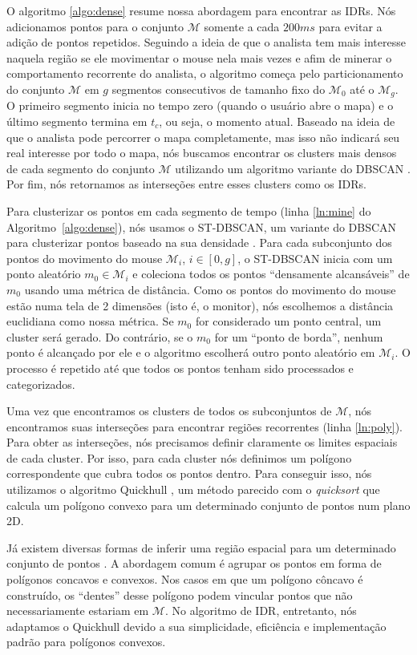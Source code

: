 O algoritmo \ref{algo:dense} resume nossa abordagem para encontrar as IDRs. Nós adicionamos pontos para o conjunto $\mathcal{M}$ somente a cada $200ms$ para evitar a adição de pontos repetidos. Seguindo a ideia de que o analista tem mais interesse naquela região se ele movimentar o mouse nela mais vezes e afim de minerar o comportamento recorrente do analista, o algoritmo começa pelo particionamento do conjunto $\mathcal{M}$ em $g$ segmentos consecutivos de tamanho fixo do $\mathcal{M}_0$ até o $\mathcal{M}_g$. O primeiro segmento inicia no tempo zero (quando o usuário abre o mapa) e o último segmento termina em $t_c$, ou seja, o momento atual. Baseado na ideia de que o analista pode percorrer o mapa completamente, mas isso não indicará seu real interesse por todo o mapa, nós buscamos encontrar os clusters mais densos de cada segmento do conjunto $\mathcal{M}$ utilizando um algoritmo variante do DBSCAN \cite{Ester:1996:DAD:3001460.3001507}. Por fim, nós retornamos as interseções entre esses clusters como os IDRs.

Para clusterizar os pontos em cada segmento de tempo (linha \ref{ln:mine} do Algoritmo~\ref{algo:dense}), nós usamos o ST-DBSCAN, um variante do DBSCAN para clusterizar pontos baseado na sua densidade \cite{Birant:2007}. Para cada subconjunto dos pontos do movimento do mouse $\mathcal{M}_i$, $i \in [0,g]$, o ST-DBSCAN inicia com um ponto aleatório $m_0 \in \mathcal{M}_i$ e coleciona todos os pontos ``densamente alcansáveis'' de $m_0$ usando uma métrica de distância. Como os pontos do movimento do mouse estão numa tela de 2 dimensões (isto é, o monitor), nós escolhemos a distância euclidiana como nossa métrica. Se $m_0$ for considerado um ponto central,  um cluster será gerado. Do contrário, se o $m_0$ for um ``ponto de borda'', nenhum ponto é alcançado por ele e o algoritmo escolherá outro ponto aleatório em $\mathcal{M}_i$. O processo é repetido até que todos os pontos tenham sido processados e categorizados.

Uma vez que encontramos os clusters de todos os subconjuntos de $\mathcal{M}$, nós encontramos suas interseções para encontrar regiões recorrentes (linha \ref{ln:poly}). Para obter as interseções, nós precisamos definir claramente os limites espaciais de cada cluster. Por isso, para cada cluster nós definimos um polígono correspondente que cubra todos os pontos dentro. Para conseguir isso, nós utilizamos o algoritmo Quickhull \cite{Barber:1996} , um método parecido com o \textit{quicksort} que calcula um polígono convexo para um determinado conjunto de pontos num plano 2D.

Já existem diversas formas de inferir uma região espacial para um determinado conjunto de pontos \cite{Bevis1989,DUCKHAM2008,FADILI2004,ARAMPATZIS2006,Galton2006}. A abordagem comum é agrupar os pontos em forma de polígonos concavos e convexos. Nos casos em que um polígono côncavo é construído, os ``dentes'' desse polígono podem vincular pontos que não necessariamente estariam em $\mathcal{M}$. No algoritmo de IDR, entretanto, nós adaptamos o Quickhull devido a sua simplicidade, eficiência e implementação padrão para polígonos convexos.